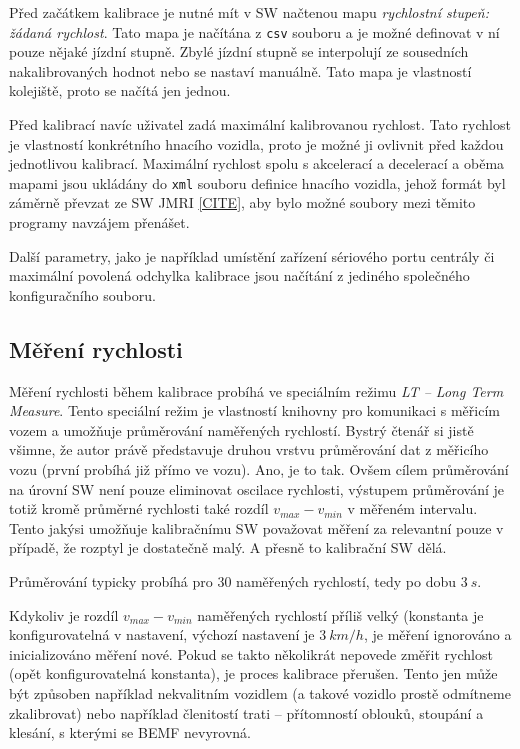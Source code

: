 Před začátkem kalibrace je nutné mít v SW načtenou mapu \textit{rychlostní
stupeň: žádaná rychlost}. Tato mapa je načítána z \texttt{csv} souboru a je
možné definovat v ní pouze nějaké jízdní stupně. Zbylé jízdní stupně se
interpolují ze sousedních nakalibrovaných hodnot nebo se nastaví manuálně.
Tato mapa je vlastností kolejiště, proto se načítá jen jednou.

Před kalibrací navíc uživatel zadá maximální kalibrovanou rychlost. Tato rychlost
je vlastností konkrétního hnacího vozidla, proto je možné ji ovlivnit před
každou jednotlivou kalibrací. Maximální rychlost spolu s akcelerací a decelerací
a oběma mapami jsou ukládány do \texttt{xml} souboru definice hnacího vozidla,
jehož formát byl záměrně převzat ze SW JMRI \ref{CITE}, aby bylo možné soubory
mezi těmito programy navzájem přenášet.

Další parametry, jako je například umístění zařízení sériového portu centrály
či maximální povolená odchylka kalibrace jsou načítání z jediného společného
konfiguračního souboru.

\subsection{Měření rychlosti}
\label{sec:ac:lt-measure}

Měření rychlosti během kalibrace probíhá ve speciálním režimu \textit{LT --
Long Term Measure}. Tento speciální režim je vlastností knihovny pro komunikaci
s měřicím vozem a umožňuje průměrování naměřených rychlostí. Bystrý čtenář si
jistě všimne, že autor právě představuje druhou vrstvu průměrování dat z
měřicího vozu (první probíhá již přímo ve vozu). Ano, je to tak. Ovšem cílem
průměrování na úrovní SW není pouze eliminovat oscilace rychlosti, výstupem
průměrování je totiž kromě průměrné rychlosti také rozdíl $v_{max} - v_{min}$ v
měřeném intervalu. Tento jakýsi  umožňuje kalibračnímu SW
považovat měření za relevantní pouze v případě, že rozptyl je dostatečně malý.
A přesně to kalibrační SW dělá.

Průměrování typicky probíhá pro $30$ naměřených rychlostí, tedy po dobu $3\ s$.

Kdykoliv je rozdíl $v_{max} - v_{min}$ naměřených rychlostí příliš velký
(konstanta je konfigurovatelná v nastavení, výchozí nastavení je $3\ km/h$, je
měření ignorováno a inicializováno měření nové. Pokud se takto několikrát
nepovede změřit rychlost (opět konfigurovatelná konstanta), je proces kalibrace
přerušen. Tento jen může být způsoben například nekvalitním vozidlem (a takové
vozidlo prostě odmítneme zkalibrovat) nebo například členitostí trati --
přítomností oblouků, stoupání a klesání, s kterými se BEMF nevyrovná.

